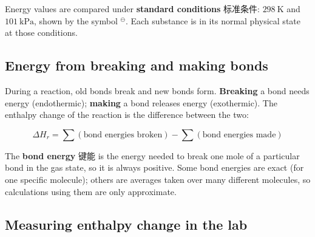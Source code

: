 \documentclass[11pt]{article}
\begin{document}
Energy values are compared under \textbf{standard conditions} 标准条件: $298\ \text{K}$ and $101\ \text{kPa}$, shown by the symbol $^{\ominus}$. Each substance is in its normal physical state at those conditions.

\begin{center}
\end{center}

\subsection*{Energy from breaking and making bonds}

During a reaction, old bonds break and new bonds form. \textbf{Breaking} a bond needs energy (endothermic); \textbf{making} a bond releases energy (exothermic). The enthalpy change of the reaction is the difference between the two:

\[
\Delta H_r = \sum (\text{bond energies broken}) - \sum (\text{bond energies made})
\]

The \textbf{bond energy} 键能 is the energy needed to break one mole of a particular bond in the gas state, so it is always positive. Some bond energies are exact (for one specific molecule); others are averages taken over many different molecules, so calculations using them are only approximate.

\subsection*{Measuring enthalpy change in the lab}
\end{document}
